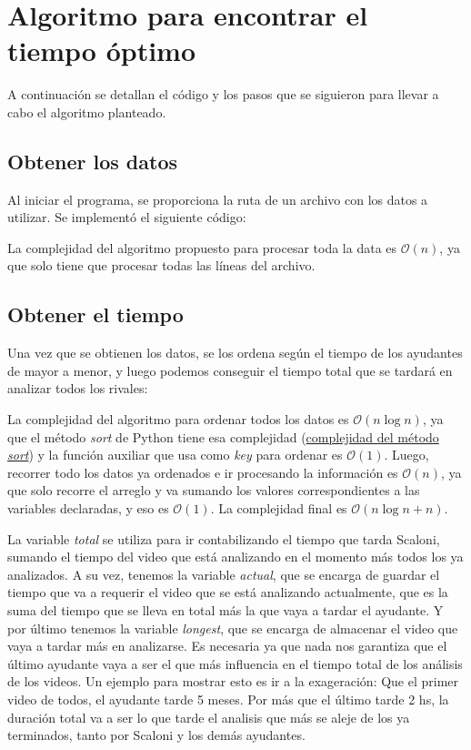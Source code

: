 \section{Algoritmo para encontrar el tiempo óptimo}

A continuación se detallan el código y los pasos que se siguieron para llevar a cabo el algoritmo planteado.

\subsection{Obtener los datos}

Al iniciar el programa, se proporciona la ruta de un archivo con los datos a utilizar. Se implementó el siguiente código:



La complejidad del algoritmo propuesto para procesar toda la data es $\mathcal{O}(n)$, ya que solo tiene que procesar todas las líneas del archivo.

\subsection{Obtener el tiempo}

Una vez que se obtienen los datos, se los ordena según el tiempo de los ayudantes de mayor a menor, y luego podemos conseguir el tiempo total que se tardará en analizar todos los rivales:



La complejidad del algoritmo para ordenar todos los datos es $\mathcal{O}\left(n \log n\right)$, ya que el método \textit{sort} de Python tiene esa complejidad (\href{https://www.geeksforgeeks.org/sort-in-python/}{complejidad del método \textit{sort}}) y la función auxiliar que usa como \textit{key} para ordenar es $\mathcal{O}(1)$. Luego, recorrer todo los datos ya ordenados e ir procesando la información es $\mathcal{O}(n)$, ya que solo recorre el arreglo y va sumando los valores correspondientes a las variables declaradas, y eso es $\mathcal{O}(1)$. La complejidad final es $\mathcal{O}\left(n \log n + n\right)$.

La variable \textit{total} se utiliza para ir contabilizando el tiempo que tarda Scaloni, sumando el tiempo del video que está analizando en el momento más todos los ya analizados. A su vez, tenemos la variable \textit{actual}, que se encarga de guardar el tiempo que va a requerir el video que se está analizando actualmente, que es la suma del tiempo que se lleva en total más la que vaya a tardar el ayudante. Y por último tenemos la variable \textit{longest}, que se encarga de almacenar el video que vaya a tardar más en analizarse. Es necesaria ya que nada nos garantiza que el último ayudante vaya a ser el que más influencia en el tiempo total de los análisis de los videos. Un ejemplo para mostrar esto es ir a la exageración: Que el primer video de todos, el ayudante tarde 5 meses. Por más que el último tarde 2 hs, la duración total va a ser lo que tarde el analisis que más se aleje de los ya terminados, tanto por Scaloni y los demás ayudantes.
